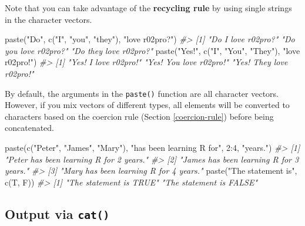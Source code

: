 \documentclass[
]{book}
\newenvironment{Shaded}{\begin{snugshade}}{\end{snugshade}}
\newcommand{\CommentTok}[1]{\textcolor[rgb]{0.56,0.35,0.01}{\textit{#1}}}
\newcommand{\DecValTok}[1]{\textcolor[rgb]{0.00,0.00,0.81}{#1}}
\newcommand{\FunctionTok}[1]{\textcolor[rgb]{0.00,0.00,0.00}{#1}}
\newcommand{\NormalTok}[1]{#1}
\newcommand{\SpecialCharTok}[1]{\textcolor[rgb]{0.00,0.00,0.00}{#1}}
\newcommand{\StringTok}[1]{\textcolor[rgb]{0.31,0.60,0.02}{#1}}
\begin{document}
Note that you can take advantage of the \textbf{recycling rule} by using single strings in the character vectors.

\begin{Shaded}
\begin{Highlighting}[]
\FunctionTok{paste}\NormalTok{(}\StringTok{"Do"}\NormalTok{, }\FunctionTok{c}\NormalTok{(}\StringTok{"I"}\NormalTok{, }\StringTok{"you"}\NormalTok{, }\StringTok{"they"}\NormalTok{), }\StringTok{"love r02pro?"}\NormalTok{)}
\CommentTok{\#\textgreater{} [1] "Do I love r02pro?"    "Do you love r02pro?"  "Do they love r02pro?"}
\FunctionTok{paste}\NormalTok{(}\StringTok{"Yes!"}\NormalTok{, }\FunctionTok{c}\NormalTok{(}\StringTok{"I"}\NormalTok{, }\StringTok{"You"}\NormalTok{, }\StringTok{"They"}\NormalTok{), }\StringTok{"love r02pro!"}\NormalTok{)}
\CommentTok{\#\textgreater{} [1] "Yes! I love r02pro!"    "Yes! You love r02pro!"  "Yes! They love r02pro!"}
\end{Highlighting}
\end{Shaded}

By default, the arguments in the \texttt{paste()} function are all character vectors. However, if you mix vectors of different types, all elements will be converted to characters based on the coercion rule (Section \ref{coercion-rule}) before being concatenated.

\begin{Shaded}
\begin{Highlighting}[]
\FunctionTok{paste}\NormalTok{(}\FunctionTok{c}\NormalTok{(}\StringTok{"Peter"}\NormalTok{, }\StringTok{"James"}\NormalTok{, }\StringTok{"Mary"}\NormalTok{), }\StringTok{"has been learning R for"}\NormalTok{, }\DecValTok{2}\SpecialCharTok{:}\DecValTok{4}\NormalTok{, }\StringTok{"years."}\NormalTok{)}
\CommentTok{\#\textgreater{} [1] "Peter has been learning R for 2 years."}
\CommentTok{\#\textgreater{} [2] "James has been learning R for 3 years."}
\CommentTok{\#\textgreater{} [3] "Mary has been learning R for 4 years."}
\FunctionTok{paste}\NormalTok{(}\StringTok{"The statement is"}\NormalTok{, }\FunctionTok{c}\NormalTok{(T, F))}
\CommentTok{\#\textgreater{} [1] "The statement is TRUE"  "The statement is FALSE"}
\end{Highlighting}
\end{Shaded}

\hypertarget{output-via-cat}{%
\subsection{\texorpdfstring{Output via \texttt{cat()}}{Output via cat()}}\label{output-via-cat}}
\end{document}
